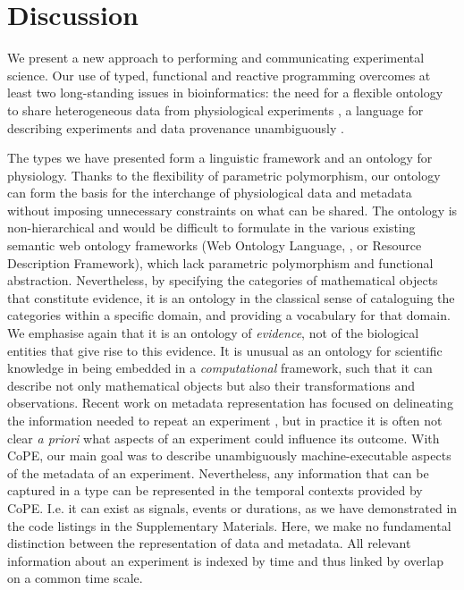 \section*{Discussion}

We present a new approach to performing and communicating experimental
science.  Our use of typed, functional and reactive programming
overcomes at least two long-standing issues in bioinformatics: the
need for a flexible ontology to share heterogeneous data from
physiological experiments \citep{Amari2002}, a language for describing
experiments and data provenance unambiguously \citep{Pool2002,
  Murray-Rust2002}.

The types we have presented form a linguistic framework and an
ontology for physiology. Thanks to the flexibility of parametric
polymorphism, our ontology can form the basis for the interchange of
physiological data and metadata without imposing unnecessary
constraints on what can be shared. The ontology is non-hierarchical
and would be difficult to formulate in the various existing semantic
web ontology frameworks (Web Ontology Language, \citep{owlref}, or
Resource Description Framework), which lack parametric polymorphism
and functional abstraction. Nevertheless, by specifying the categories
of mathematical objects that constitute evidence, it is an ontology in
the classical sense of cataloguing the categories within a specific
domain, and providing a vocabulary for that domain. We emphasise again
that it is an ontology of \emph{evidence}, not of the biological
entities that give rise to this evidence. It is unusual as an ontology
for scientific knowledge in being embedded in a \emph{computational}
framework, such that it can describe not only mathematical objects but
also their transformations and observations. Recent work on metadata
representation \citep{Bower2009} has focused on delineating the
information needed to repeat an experiment \citep{Taylor2007,
  Gibson2008}, but in practice it is often not clear \emph{a priori}
what aspects of an experiment could influence its outcome. With CoPE,
our main goal was to describe unambiguously machine-executable aspects
of the metadata of an experiment. Nevertheless, any information that
can be captured in a type can be represented in the temporal contexts
provided by CoPE. I.e. it can exist as signals, events or durations,
as we have demonstrated in the code listings in the Supplementary
Materials. Here, we make no fundamental distinction between the
representation of data and metadata. All relevant information about an
experiment is indexed by time and thus linked by overlap on a common
time scale.

